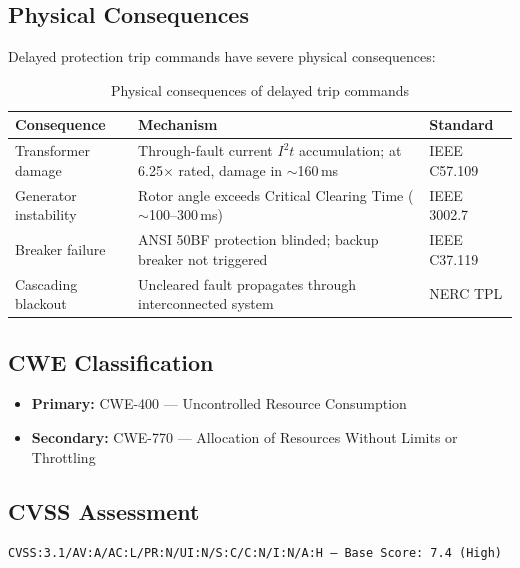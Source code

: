 \documentclass[11pt,a4paper]{article}
\begin{document}
\subsection{Physical Consequences}

Delayed protection trip commands have severe physical consequences:

\begin{table}[H]
\centering
\caption{Physical consequences of delayed trip commands}
\begin{tabularx}{\textwidth}{@{}lXl@{}}
\toprule
\textbf{Consequence} & \textbf{Mechanism} & \textbf{Standard} \\
\midrule
Transformer damage & Through-fault current $I^2 t$ accumulation; at 6.25$\times$ rated, damage in $\sim$160\,ms & IEEE C57.109 \\
Generator instability & Rotor angle exceeds Critical Clearing Time ($\sim$100--300\,ms) & IEEE 3002.7 \\
Breaker failure & ANSI 50BF protection blinded; backup breaker not triggered & IEEE C37.119 \\
Cascading blackout & Uncleared fault propagates through interconnected system & NERC TPL \\
\bottomrule
\end{tabularx}
\end{table}

\subsection{CWE Classification}

\begin{itemize}[leftmargin=2em]
    \item \textbf{Primary:} CWE-400 --- Uncontrolled Resource Consumption
    \item \textbf{Secondary:} CWE-770 --- Allocation of Resources Without Limits or Throttling
\end{itemize}

\subsection{CVSS Assessment}

\begin{verbatim}
CVSS:3.1/AV:A/AC:L/PR:N/UI:N/S:C/C:N/I:N/A:H — Base Score: 7.4 (High)
\end{verbatim}
\end{document}
